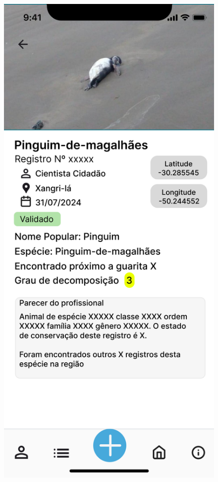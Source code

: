 \begin{figure}[H]
    \centering
    \begin{minipage}[b]{0.48\textwidth}
        \centering
        \includegraphics[height=0.6\textheight]{imagens/ver-registro-figma.png}

\end{minipage}
\end{figure}
